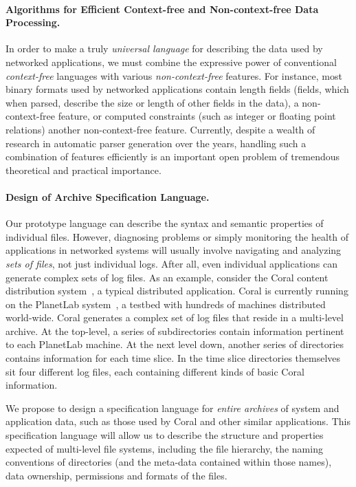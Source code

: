 \paragraph*{Algorithms for Efficient Context-free and Non-context-free Data Processing.}
In order to make \pads{} a truly {\em universal language} for describing the data used by
networked applications, we must combine the expressive power of conventional 
{\em context-free} languages with various {\em non-context-free} features.  
For instance, most binary formats used by networked applications
contain length fields (fields, which when parsed,
describe the size or length of other fields in the data), a non-context-free feature,
or computed constraints (such as integer or floating point relations) another non-context-free
feature.  Currently, despite a wealth of research in automatic parser generation over the years,
handling such a combination of features efficiently is an important open problem of tremendous
theoretical and practical importance.

\paragraph*{Design of Archive Specification Language.}  
Our prototype \pads{} language can describe the syntax and semantic properties
of individual files.  However, diagnosing problems or simply monitoring
the health of applications in networked systems
will usually involve navigating and analyzing {\em sets of files},
not just individual logs.  After all, even individual
applications can generate complex sets of log files. 
As an example, consider the Coral content
distribution system~\cite{coral}, a typical distributed application.
Coral is currently running on the PlanetLab system~\cite{planetlab}, a
testbed with hundreds of machines distributed world-wide.
Coral generates a complex set of log files that
reside in a multi-level archive.  At the top-level, a series of subdirectories
contain information pertinent to each PlanetLab machine.  At the next level down,
another series of directories contains information for each time slice.  In the
time slice directories themselves sit four different log files, each containing different 
kinds of basic Coral information.

We propose to design a specification language for {\em entire archives} of 
system and application data, such as those used by Coral and other similar
applications.  This specification language will allow us to describe the structure and
properties expected of multi-level file systems, including the file hierarchy, the
naming conventions of directories (and the meta-data contained within those names), data 
ownership, permissions and formats of the files.

